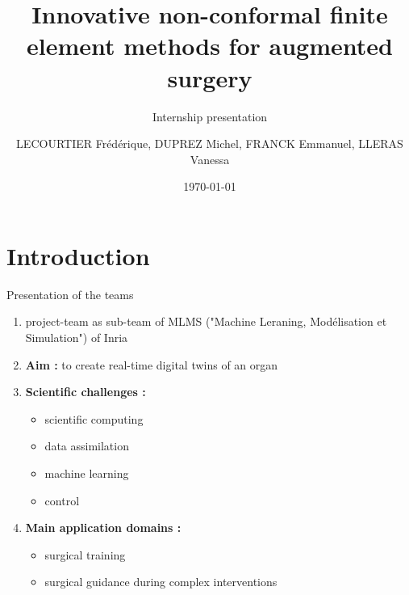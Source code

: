 \documentclass[compress,10pt,xcolor={table,dvipsnames},t]{beamer}
\title[PhiFEM]{Innovative non-conformal finite element methods for augmented surgery}
\subtitle{Internship presentation}
\author[name]{LECOURTIER Frédérique, DUPREZ Michel, FRANCK Emmanuel, LLERAS Vanessa}
\institute{\large Strasbourg University}
\date{\today}
\begin{document}
	\nocite{*}
	
	\begin{frame}
		\vspace{-20pt}
		\titlepage
	\end{frame}
	
	\AtBeginSection[]{
		\begin{frame}
			\vfill
			\centering
			\begin{beamercolorbox}[sep=5pt,shadow=true,rounded=true]{subtitle}
				\usebeamerfont{title}\insertsectionhead\par%
			\end{beamercolorbox}
			\tableofcontents[sectionstyle=hide,subsectionstyle=show/shaded/hide]
			\vfill
		\end{frame}
	}


	\section{Introduction}

	\begin{frame}{Presentation of the teams}
		\begin{center}
		\end{center}
		\begin{enumerate}[\ding{217}]
			\item project-team as sub-team of MLMS ("Machine Leraning, Modélisation et Simulation") of Inria
			\item \textbf{Aim :} to create real-time digital twins of an organ
			\item \textbf{Scientific challenges :}
			\begin{itemize}
				\item scientific computing
				\item data assimilation
				\item machine learning
				\item control
			\end{itemize}
			\item \textbf{Main application domains :}
			\begin{itemize}
				\item surgical training
				\item surgical guidance during complex interventions
			\end{itemize}
		\end{enumerate}
	\end{frame}
\end{document}
